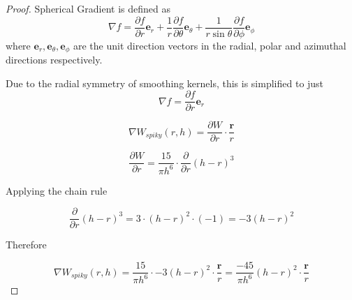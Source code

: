 \documentclass[12pt]{article}
\begin{document}
    \begin{proof}
        Spherical Gradient is defined as
        $$\nabla f = \frac{\partial{f}}{\partial{r}}\textbf{e}_r + \frac{1}{r}\frac{\partial{f}}{\partial{\theta}}\textbf{e}_{\theta} + \frac{1}{r \sin{\theta}}\frac{\partial{f}}{\partial{\phi}}\textbf{e}_{\phi}$$
        where $\textbf{e}_{r}, \textbf{e}_{\theta}, \textbf{e}_{\phi}$ are the unit direction vectors in the radial, polar and azimuthal directions respectively.

        Due to the radial symmetry of smoothing kernels, this is simplified to just $$\nabla f = \frac{\partial{f}}{\partial{r}}\textbf{e}_r$$

        $$\nabla W_{spiky}(r, h) = \frac{\partial{W}}{\partial{r}} \cdot \frac{\textbf{r}}{r}$$

        $$\frac{\partial{W}}{\partial{r}} = \frac{15}{\pi{h}^6} \cdot \frac{\partial}{\partial{r}} (h - r)^3$$

        Applying the chain rule

        $$\frac{\partial}{\partial{r}} (h - r)^3 = 3 \cdot (h - r)^2 \cdot (-1) = -3(h - r)^2$$

        Therefore

        $$\nabla{W_{spiky}(r, h)} = \frac{15}{\pi{h}^6} \cdot -3(h - r)^2 \cdot \frac{\textbf{r}}{r} = \frac{-45}{\pi{h}^6}(h - r)^2 \cdot \frac{\textbf{r}}{r}$$
    \end{proof}
\end{document}
